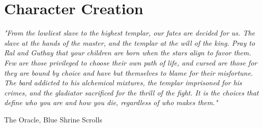 \chapter{Character Creation}\label{chap:creation}

\epigraph{\textit{
    "From the lowliest slave to the highest templar, our fates are decided for us. The slave at the hands of the master, and the
    templar at the will of the king. Pray to Ral and Guthay that your children are born when the stars align to favor them.
    Few are those privileged to choose their own path of life, and cursed are those for they are bound by choice and have but
    themselves to blame for their misfortune. The bard addicted to his alchemical mixtures, the templar imprisoned for his
    crimes, and the gladiator sacrificed for the thrill of the fight. It is the choices that define who you are and how you die,
    regardless of who makes them." } } { The Oracle, Blue Shrine Scrolls }

